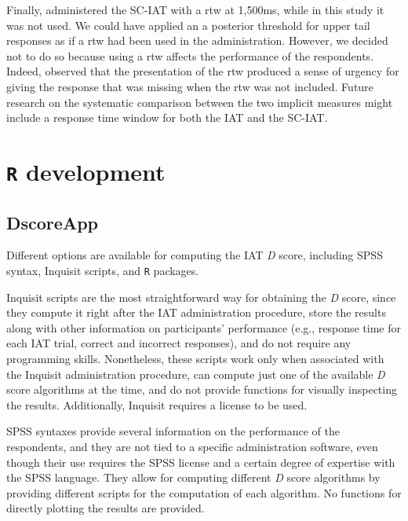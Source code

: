 \documentclass[12pt]{book}
\begin{document}
Finally,  administered the SC-IAT with a rtw at 1,500ms, while in this study it was not used. We could have applied an a posterior threshold for upper tail responses as if a rtw had been used in the administration. However, we decided not to do so because using a rtw affects the performance of the respondents. Indeed,  observed that the presentation of the rtw produced a sense of urgency for giving the response that was missing when the rtw was not included. Future research on the systematic comparison between the two implicit measures might include a response time window for both the IAT and the SC-IAT.


\section{\texttt{R} development}
\subsection{DscoreApp}\label{sec:dscoreapp}


Different options are available for computing the IAT \emph{D} score, including SPSS syntax, Inquisit scripts, and \texttt{R} packages. 

Inquisit scripts are  the most straightforward way for obtaining the \emph{D} score, since they compute it right after the IAT administration procedure, store the results along with other information on participants' performance (e.g., response time for each IAT trial, correct and incorrect responses), and do not require any programming skills. Nonetheless, these scripts work only when associated with the Inquisit administration procedure, can compute just one of the available \emph{D} score algorithms at the time, and do not provide functions for visually inspecting the results. Additionally, Inquisit requires a license to be used. 

SPSS syntaxes provide several information on the performance of the respondents, and they are not tied to a specific administration software, even though their use requires the SPSS license and a certain degree of expertise with the SPSS language. They allow for computing different \emph{D} score algorithms by providing different scripts for the computation of each algorithm. No functions for directly plotting the results are provided.
\end{document}
